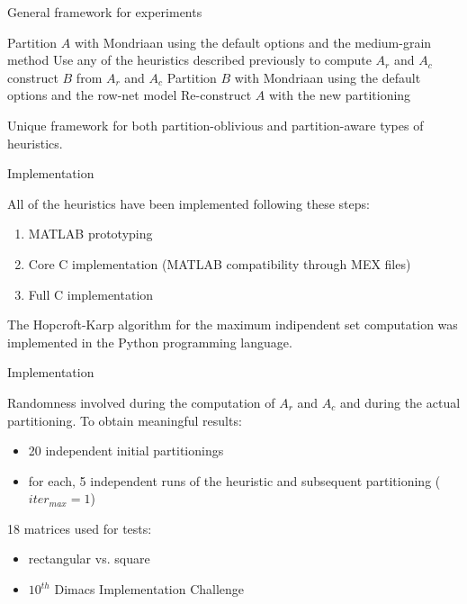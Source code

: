 \begin{frame}{General framework for experiments}
	\begin{algorithm}[H]
		\small
		\begin{algorithmic}
			\State Partition $A$ with Mondriaan using the default options and the medium-grain method
			\State Use any of the heuristics described previously to compute $A_r$ and $A_c$
			\State construct $B$ from $A_r$ and $A_c$
			\State Partition $B$ with Mondriaan using the default options and the row-net model
			\State Re-construct $A$ with the new partitioning
			\EndFor
		\end{algorithmic}
	\end{algorithm}

	Unique framework for both partition-oblivious and partition-aware types of heuristics.

\end{frame}

\begin{frame}{Implementation}

	All of the heuristics have been implemented following these steps:

	\begin{enumerate}
		\item MATLAB prototyping
		\item Core C implementation (MATLAB compatibility through MEX files)
		\item Full C implementation
	\end{enumerate}

	The Hopcroft-Karp algorithm for the maximum indipendent set computation was implemented in the Python programming language.

\end{frame}

\begin{frame}{Implementation}

	Randomness involved during the computation of $A_r$ and $A_c$ and during the actual partitioning. To obtain meaningful results:

	\begin{itemize}
		\item 20 independent initial partitionings
		\item for each, 5 independent runs of the heuristic and subsequent partitioning ($iter_{max} = 1$)
	\end{itemize}

	18 matrices used for tests: 
	\begin{itemize}
		\item rectangular vs. square
		\item $10^{th}$ Dimacs Implementation Challenge
	\end{itemize}
\end{frame}

